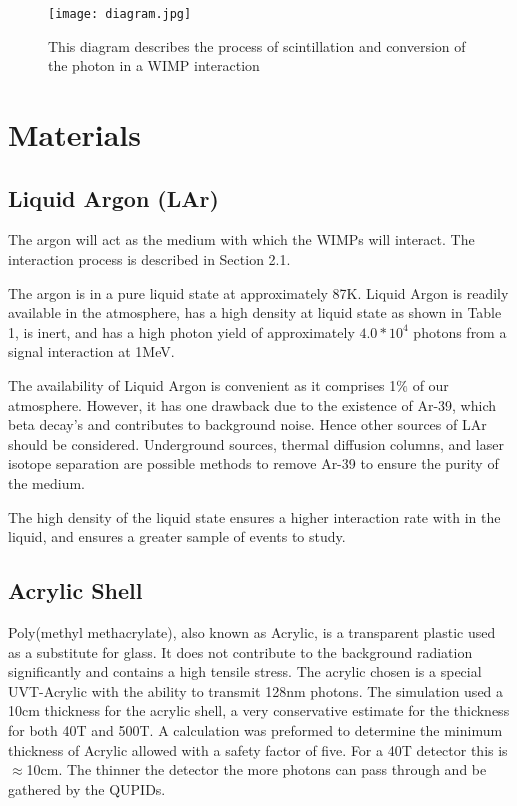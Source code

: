 \documentclass[11pt,a4paper,oneside]{report}
\begin{document}
\begin{figure}[h]
\centering
\texttt{[image: diagram.jpg]}
\caption{This diagram describes the process of scintillation and conversion of the photon in a WIMP interaction}
\end{figure}

\section{Materials}
\subsection{Liquid Argon (LAr)}
The argon will act as the medium with which the WIMPs will interact. The interaction process is described in Section 2.1.

The argon is in a pure liquid state at approximately 87K. Liquid Argon is readily available in the atmosphere, has a high density at liquid state as shown in Table 1, is inert, and has a high photon yield of approximately $4.0*10^4$ photons\cite{20} from a signal interaction at 1MeV. 

The availability of Liquid Argon is convenient as it comprises 1$\%$ of our atmosphere. However, it has one drawback due to the existence of Ar-39, which beta decay’s and contributes to background noise. Hence other sources of LAr should be considered. Underground sources, thermal diffusion columns, and laser isotope separation are possible methods to remove Ar-39\cite{20} to ensure the purity of the medium.

The high density of the liquid state ensures a higher interaction rate with in the liquid, and ensures a greater sample of events to study. 

\subsection{Acrylic Shell}
 Poly(methyl methacrylate), also known as Acrylic, is a transparent plastic used as a substitute for glass. It does not contribute to the background radiation significantly and contains a high tensile stress. The acrylic chosen is a special UVT-Acrylic with the ability to transmit 128nm photons. The simulation used a 10cm thickness for the acrylic shell, a very conservative estimate for the thickness for both 40T and 500T. A calculation was preformed to determine the minimum thickness of Acrylic allowed with a safety factor of five. For a 40T detector this is $\approx$10cm. The thinner the detector the more photons can pass through and be gathered by the QUPIDs. 
\end{document}
